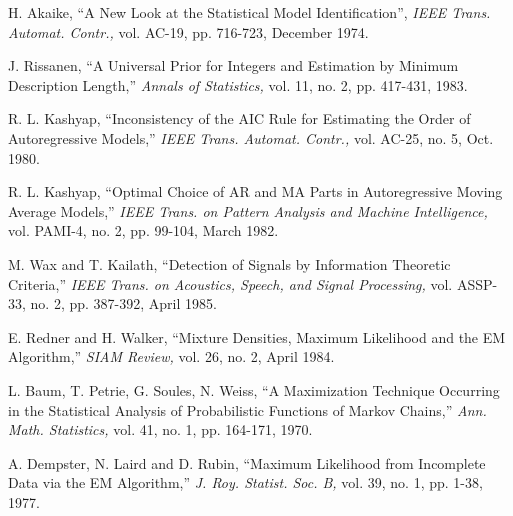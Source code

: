 \documentclass[12pt]{article}
\begin{document}
\begin{thebibliography}{99}




H. Akaike, ``A New Look at the Statistical Model Identification'',
{\em IEEE Trans. Automat. Contr.,}
vol. AC-19, pp. 716-723, December 1974.

J. Rissanen,
``A Universal Prior for Integers and Estimation by Minimum
Description Length,''
{\em Annals of Statistics,}
vol. 11, no. 2, pp. 417-431, 1983.

R. L. Kashyap,
``Inconsistency of the AIC Rule for Estimating the Order of Autoregressive Models,''
{\em IEEE Trans. Automat. Contr.,}
vol. AC-25, no. 5, Oct. 1980.

R. L. Kashyap,
``Optimal Choice of AR and MA Parts in Autoregressive Moving Average Models,''
{\em IEEE Trans. on Pattern Analysis and Machine Intelligence,}
vol. PAMI-4, no. 2, pp. 99-104, March 1982.

M. Wax and T. Kailath,
``Detection of Signals by Information Theoretic Criteria,''
{\em IEEE Trans. on Acoustics, Speech, and Signal Processing,}
vol. ASSP-33, no. 2, pp. 387-392, April 1985.

E. Redner and H. Walker, ``Mixture Densities, Maximum Likelihood and
the EM Algorithm,'' {\em SIAM Review,} vol. 26, no. 2, April 1984.

L. Baum, T. Petrie, G. Soules, N. Weiss,
``A Maximization Technique Occurring in the Statistical Analysis
of Probabilistic Functions of Markov Chains,''
{\em Ann. Math. Statistics,} vol. 41, no. 1, pp. 164-171, 1970.

A. Dempster, N. Laird and D. Rubin,
``Maximum Likelihood from Incomplete Data via the EM Algorithm,''
{\em J. Roy. Statist. Soc. B,} vol. 39, no. 1, pp. 1-38, 1977.


\end{thebibliography}
\end{document}
